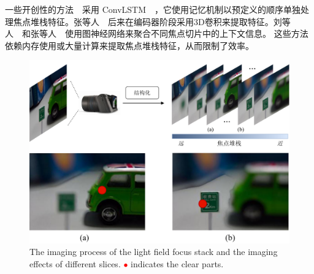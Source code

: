%
%
%
%
%
%
一些开创性的方法~\cite{zhang2019memory,piao2020exploit}~采用 ConvLSTM~\cite{shi2015convolutional}~，它使用记忆机制以预定义的顺序单独处理焦点堆栈特征。张等人~\cite{zhang2021learning}~后来在编码器阶段采用3D卷积来提取特征。刘等人~\cite{liu2021light}~和张等人~\cite{zhang2021geometry}~使用图神经网络来聚合不同焦点切片中的上下文信息。 这些方法依赖内存使用或大量计算来提取焦点堆栈特征，从而限制了效率。
%
%
%
%
\par
%
%
\begin{figure}[ht]
	\centering
	\includegraphics[width=0.85\linewidth]{figures/chapter3/cpt3_idea.pdf}
	{ %
		The imaging process of the light field focus stack and the imaging effects of different slices.
		\textcolor{red}{$\bullet$} indicates the clear parts.  
	}
	\label{figure:cpt3:idea}
	
\end{figure}
